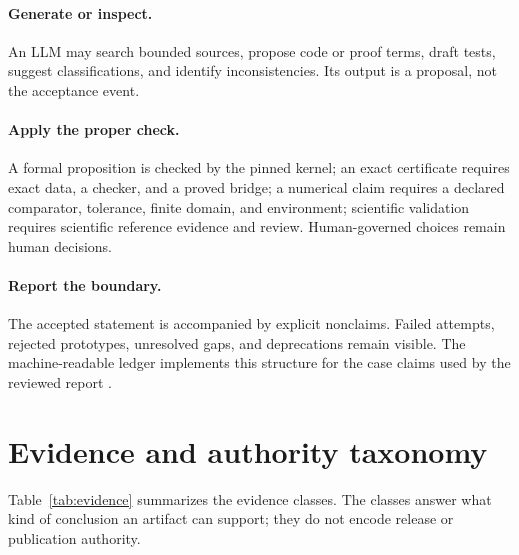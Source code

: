 \documentclass[11pt]{article}
\begin{document}
\paragraph{Generate or inspect.}
An LLM may search bounded sources, propose code or proof terms, draft tests,
suggest classifications, and identify inconsistencies. Its output is a
proposal, not the acceptance event.

\paragraph{Apply the proper check.}
A formal proposition is checked by the pinned kernel; an exact certificate
requires exact data, a checker, and a proved bridge; a numerical claim requires
a declared comparator, tolerance, finite domain, and environment; scientific
validation requires scientific reference evidence and review. Human-governed
choices remain human decisions.

\paragraph{Report the boundary.}
The accepted statement is accompanied by explicit nonclaims. Failed attempts,
rejected prototypes, unresolved gaps, and deprecations remain visible. The
machine-readable ledger implements this structure for the case claims used by
the reviewed report \citep{projectkoios_ledger_2026}.

\section{Evidence and authority taxonomy}
\label{sec:taxonomy}

Table~\ref{tab:evidence} summarizes the evidence classes. The classes answer
what kind of conclusion an artifact can support; they do not encode release or
publication authority.
\end{document}
